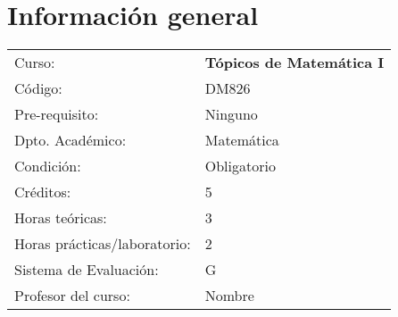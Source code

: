 \section{Información general}

\providecommand{\name}{Nombre}
\begin{table}[ht!]
    \begin{tabular}{ll}
        Curso:
         & \textbf{Tópicos de Matemática I} \\
        Código:
         & DM826                                                              \\
        Pre-requisito:
         & Ninguno                       \\
        Dpto. Académico:
         & Matemática                                                         \\
        Condición:
         & Obligatorio                                                           \\
        Créditos:
         & 5                                                                  \\
        Horas teóricas:
         & 3                                                                  \\
        Horas prácticas/laboratorio:
         & 2                                                                  \\
        Sistema de Evaluación:
         & G                                                                  \\
        Profesor del curso:
         & \name
    \end{tabular}
\end{table}